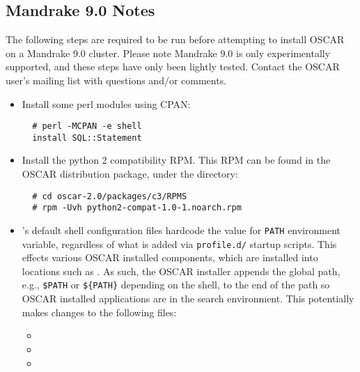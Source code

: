 
\subsection{Mandrake 9.0 Notes}
\label{subsec:mdk90notes}

The following steps are required to be run before attempting to
install OSCAR on a Mandrake 9.0 cluster.  Please note Mandrake 9.0 is
only experimentally supported, and these steps have only been lightly
tested.  Contact the OSCAR user's mailing list with questions and/or
comments.

\begin{itemize}
\item Install some perl modules using CPAN:

\begin{verbatim}
  # perl -MCPAN -e shell
  install SQL::Statement
\end{verbatim}
  
\item Install the python 2 compatibility RPM.  This RPM can be found
  in the OSCAR distribution package, under the 
  directory:

\begin{verbatim}
  # cd oscar-2.0/packages/c3/RPMS
  # rpm -Uvh python2-compat-1.0-1.noarch.rpm
\end{verbatim}

\item {}'s default shell configuration files hardcode the
  value for {\tt PATH} environment variable, regardless of what is
  added via {\tt profile.d/} startup scripts.  This effects various
  OSCAR installed components, which are installed into locations such
  as .  As such, the OSCAR installer appends the global path,
  e.g., {\tt \$PATH} or {\tt \$\{PATH\}} depending on the shell, to the end
  of the path so OSCAR installed applications are in the search
  environment.  This potentially makes changes to the following files:

  \begin{itemize}
  \item {}
  \item {}
  \item {}
  \end{itemize}

\end{itemize}

